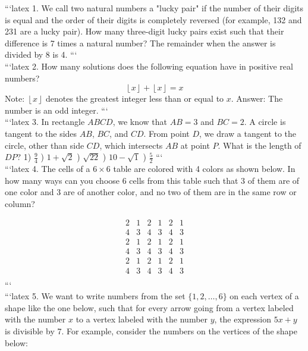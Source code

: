 ```latex
1. We call two natural numbers a "lucky pair" if the number of their digits is equal and the order of their digits is completely reversed (for example, 132 and 231 are a lucky pair). How many three-digit lucky pairs exist such that their difference is 7 times a natural number? The remainder when the answer is divided by 8 is 4.
```
\\
```latex
2. How many solutions does the following equation have in positive real numbers?  
\[ \left\lfloor x \right\rfloor + \left\lfloor x \right\rfloor = x \]  
Note: \(\left\lfloor x \right\rfloor\) denotes the greatest integer less than or equal to \(x\).  
Answer: The number is an odd integer.
```
\\
```latex
3. In rectangle $ABCD$, we know that $AB = 3$ and $BC = 2$. A circle is tangent to the sides $AB$, $BC$, and $CD$. From point $D$, we draw a tangent to the circle, other than side $CD$, which intersects $AB$ at point $P$. What is the length of $DP$? 
1) $\frac{9}{4}$ ) $1 + \sqrt{2}$ ) $\sqrt{22}$ ) $10 - \sqrt{1}$ ) $\frac{5}{2}$
```
\\
```latex
4. The cells of a $6 \times 6$ table are colored with 4 colors as shown below. In how many ways can you choose 6 cells from this table such that 3 of them are of one color and 3 are of another color, and no two of them are in the same row or column?

\[
\begin{array}{cccccc}
2 & 1 & 2 & 1 & 2 & 1 \\
4 & 3 & 4 & 3 & 4 & 3 \\
2 & 1 & 2 & 1 & 2 & 1 \\
4 & 3 & 4 & 3 & 4 & 3 \\
2 & 1 & 2 & 1 & 2 & 1 \\
4 & 3 & 4 & 3 & 4 & 3 \\
\end{array}
\]
```
\\
```latex
5. We want to write numbers from the set $\{1, 2, \ldots, 6\}$ on each vertex of a shape like the one below, such that for every arrow going from a vertex labeled with the number $x$ to a vertex labeled with the number $y$, the expression $5x + y$ is divisible by 7. For example, consider the numbers on the vertices of the shape below:

